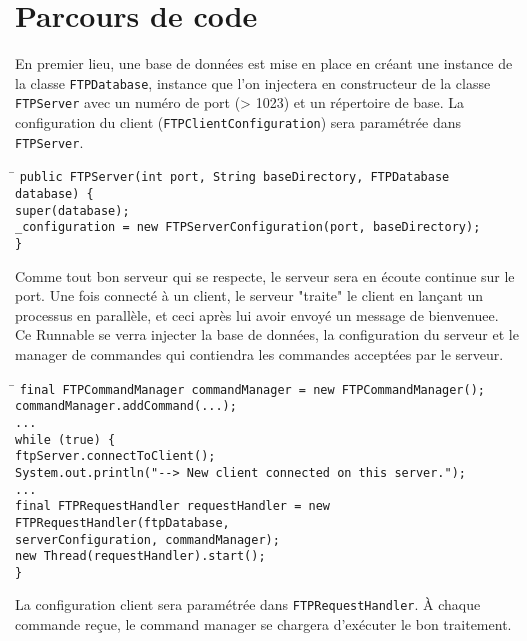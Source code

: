 \section*{Parcours de code}
En premier lieu, une base de données est mise en place en créant une instance de la classe \verb+FTPDatabase+, instance que l'on injectera en constructeur de la classe \verb+FTPServer+ avec un numéro de port (> 1023) et un répertoire de base. La configuration du client (\verb+FTPClientConfiguration+) sera paramétrée dans \verb+FTPServer+.
\begin{tabbing}
\hspace{1cm}\=\kill
\verb+public FTPServer(int port, String baseDirectory, FTPDatabase database) {+\\
	\>\verb+super(database);+\\
	\>\verb+_configuration = new FTPServerConfiguration(port, baseDirectory);+\\
\verb+}+
\end{tabbing}
Comme tout bon serveur qui se respecte, le serveur sera en écoute continue sur le port. Une fois connecté à un client, le serveur "traite" le client en lançant un processus en parallèle, et ceci après lui avoir envoyé un message de bienvenuee. Ce Runnable se verra injecter la base de données, la configuration du serveur et le manager de commandes qui contiendra les commandes acceptées par le serveur.
\begin{tabbing}
\hspace{1cm}\=\kill
\verb+final FTPCommandManager commandManager = new FTPCommandManager();+\\
\verb+commandManager.addCommand(...);+\\
\verb+...+\\
\verb+while (true) {+\\
	\>\verb+ftpServer.connectToClient();+\\
	\>\verb+System.out.println("--> New client connected on this server.");+\\
	\>\verb+...+\\
	\>\verb+final FTPRequestHandler requestHandler = new FTPRequestHandler(ftpDatabase,+\\
	\>\verb+serverConfiguration, commandManager);+\\
	\>\verb+new Thread(requestHandler).start();+\\
		\verb+}+
\end{tabbing}

La configuration client sera paramétrée dans \verb+FTPRequestHandler+.
À chaque commande reçue, le command manager se chargera d'exécuter le bon traitement.


